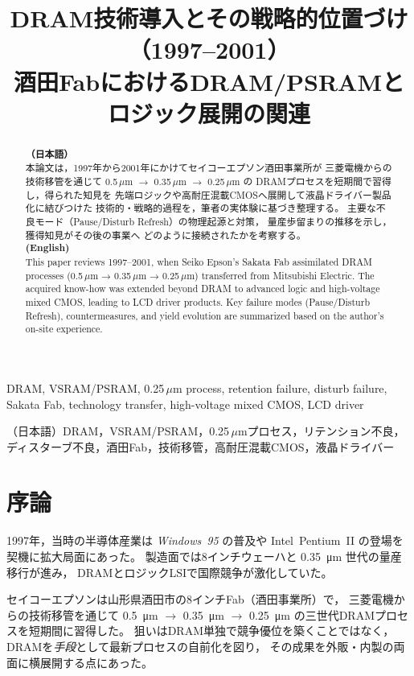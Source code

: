 \documentclass[conference]{IEEEtran}
\title{DRAM技術導入とその戦略的位置づけ（1997--2001）\\
\large 酒田FabにおけるDRAM/PSRAMとロジック展開の関連}
\author{%
  \IEEEauthorblockN{三溝 真一 (Shinichi Samizo)}%
  \IEEEauthorblockA{独立系半導体研究者（元セイコーエプソン）\\%
  Independent Semiconductor Researcher (ex-Seiko Epson)\\%
  Email: \href{mailto:shin3t72@gmail.com}{shin3t72@gmail.com}\\%
  GitHub: \url{https://github.com/Samizo-AITL}}%
}
\let\meter\metre
\begin{document}
\maketitle

\begin{abstract}
\textbf{（日本語）}\\
本論文は，1997年から2001年にかけてセイコーエプソン酒田事業所が
三菱電機からの技術移管を通じて \mbox{0.5\,$\mu$m} $\rightarrow$ \mbox{0.35\,$\mu$m} $\rightarrow$ \mbox{0.25\,$\mu$m} の
DRAMプロセスを短期間で習得し，得られた知見を
先端ロジックや高耐圧混載CMOSへ展開して液晶ドライバー製品化に結びつけた
技術的・戦略的過程を，筆者の実体験に基づき整理する。
主要な不良モード（Pause/Disturb Refresh）の物理起源と対策，
量産歩留まりの推移を示し，獲得知見がその後の事業へ
どのように接続されたかを考察する。\\[1ex]

\textbf{(English)}\\
This paper reviews 1997–2001, when Seiko Epson’s Sakata Fab
assimilated DRAM processes (0.5\,$\mu$m → 0.35\,$\mu$m → 0.25\,$\mu$m) transferred from Mitsubishi Electric.
The acquired know-how was extended beyond DRAM to advanced logic
and high-voltage mixed CMOS, leading to LCD driver products.
Key failure modes (Pause/Disturb Refresh), countermeasures, and yield evolution
are summarized based on the author’s on-site experience.
\end{abstract}

\begin{IEEEkeywords}
DRAM, VSRAM/PSRAM, 0.25\,$\mu$m process, retention failure, disturb failure, Sakata Fab, technology transfer, high-voltage mixed CMOS, LCD driver

\hspace{1em}（日本語）DRAM，VSRAM/PSRAM，0.25\,$\mu$mプロセス，リテンション不良，ディスターブ不良，酒田Fab，技術移管，高耐圧混載CMOS，液晶ドライバー
\end{IEEEkeywords}

\section{序論}
1997年，当時の半導体産業は \textit{Windows~95} の普及や
Intel~Pentium~II の登場を契機に拡大局面にあった。
製造面では8インチウェーハと \SI{0.35}{\micro\meter} 世代の量産移行が進み，
DRAMとロジックLSIで国際競争が激化していた。

セイコーエプソンは山形県酒田市の8インチFab（酒田事業所）で，
三菱電機からの技術移管を通じて
\SI{0.5}{\micro\meter} $\rightarrow$ \SI{0.35}{\micro\meter} $\rightarrow$ \SI{0.25}{\micro\meter}
の三世代DRAMプロセスを短期間に習得した。  
狙いはDRAM単独で競争優位を築くことではなく，
DRAMを\emph{手段}として最新プロセスの自前化を図り，
その成果を外販・内製の両面に横展開する点にあった。  
\end{document}
